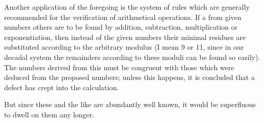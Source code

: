 \documentclass{book}
\theoremstyle{plain}
\begin{document}
Another application of the foregoing is the system of rules which are generally recommended for the verification of arithmetical operations.   If a from given numbers others are to be found by addition, subtraction, multiplication or exponentiation, then instead of the given numbers their minimal residues are substituted according to the arbitrary modulus (I mean 9 or 11, since in our decadal system the remainders according to these moduli can be found so easily).  The numbers derived from this must be congruent with those which were deduced from the proposed numbers; unless this happens, it is concluded that a defect has crept into the calculation.

But since these and the like are abundantly well known, it would be superfluous to dwell on them any longer.
\end{document}
